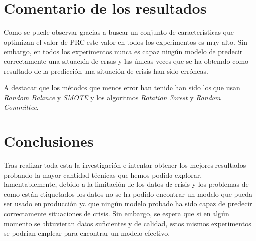 \documentclass[a4paper,12pt,twoside,oldfontcommands]{memoir}
\begin{document}
	\section{Comentario de los resultados}
	Como se puede observar gracias a buscar un conjunto de características que optimizan el valor de PRC este valor en todos los experimentos es muy alto. Sin embargo, en todos los experimentos nunca es capaz ningún modelo de predecir correctamente una situación de crisis y las únicas veces que se ha obtenido como resultado de la predicción una situación de crisis han sido erróneas.
	
	A destacar que los métodos que menos error han tenido han sido los que usan \textit{Random Balance} y \textit{SMOTE} y los algoritmos \textit{Rotation Forest} y \textit{Random Committee}.
	
	\section{Conclusiones}
	Tras realizar toda esta la investigación e intentar obtener los mejores resultados probando la mayor cantidad técnicas que hemos podido explorar, lamentablemente, debido a la limitación de los datos de crisis y los problemas de como están etiquetados los datos no se ha podido encontrar un modelo que pueda ser usado en producción ya que ningún modelo probado ha sido capaz de predecir correctamente situaciones de crisis. Sin embargo, se espera que si en algún momento se obtuvieran datos suficientes y de calidad, estos mismos experimentos se podrían emplear para encontrar un modelo efectivo. 
	
	
	
	
\end{document}
